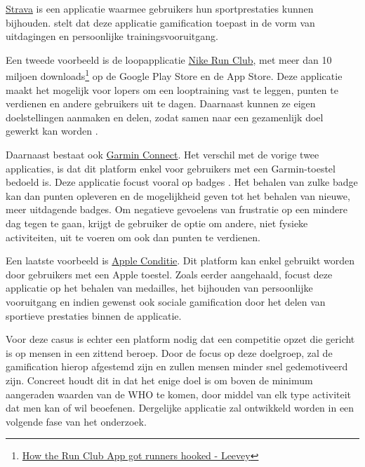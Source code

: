 \href{https://www.strava.com/}{Strava} is een applicatie waarmee gebruikers hun sportprestaties kunnen bijhouden. \textcite{Barratt2017} stelt dat deze applicatie gamification toepast in de vorm van uitdagingen en persoonlijke trainingsvooruitgang.

Een tweede voorbeeld is de loopapplicatie \href{https://www.nike.com/be/en/nrc-app}{Nike Run Club}, met meer dan 10 miljoen downloads\footnote{\href{https://bootcamp.uxdesign.cc/how-the-nike-run-club-app-got-runners-hooked-2850c7654fc5}{How the Run Club App got runners hooked - Leevey}} op de Google Play Store en de App Store. Deze applicatie maakt het mogelijk voor lopers om een looptraining vast te leggen, punten te verdienen en andere gebruikers uit te dagen. Daarnaast kunnen ze eigen doelstellingen aanmaken en delen, zodat samen naar een gezamenlijk doel gewerkt kan worden \autocite{StaalnackeLarsson2013}.

Daarnaast bestaat ook \href{https://connect.garmin.com/}{Garmin Connect}. Het verschil met de vorige twee applicaties, is dat dit platform enkel voor gebruikers met een Garmin-toestel bedoeld is. Deze applicatie focust vooral op badges \autocite{Ilhan2019}. Het behalen van zulke badge kan dan punten opleveren en de mogelijkheid geven tot het behalen van nieuwe, meer uitdagende badges. Om negatieve gevoelens van frustratie op een mindere dag tegen te gaan, krijgt de gebruiker de optie om andere, niet fysieke activiteiten, uit te voeren om ook dan punten te verdienen.

Een laatste voorbeeld is \href{https://support.apple.com/nl-be/guide/iphone/ipha5dddb411/ios}{Apple Conditie}. Dit platform kan enkel gebruikt worden door gebruikers met een Apple toestel. Zoals eerder aangehaald, focust deze applicatie op het behalen van medailles, het bijhouden van persoonlijke vooruitgang en indien gewenst ook sociale gamification door het delen van sportieve prestaties binnen de applicatie.

Voor deze casus is echter een platform nodig dat een competitie opzet die gericht is op mensen in een zittend beroep. Door de focus op deze doelgroep, zal de gamification hierop afgestemd zijn en zullen mensen minder snel gedemotiveerd zijn. Concreet houdt dit in dat het enige doel is om boven de minimum aangeraden waarden van de WHO te komen, door middel van elk type activiteit dat men kan of wil beoefenen. Dergelijke applicatie zal ontwikkeld worden in een volgende fase van het onderzoek.
